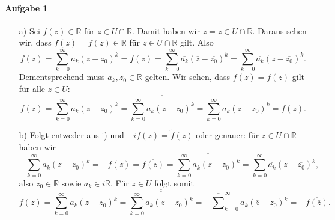 \documentclass[11pt,a4paper]{article}
\theoremstyle{definition} \newtheorem{theo}{Theorem}[section]
\theoremstyle{definition} \newtheorem{defi}{Definition}[section]
\theoremstyle{definition} \newtheorem{cor}{Corollary}[section]
\theoremstyle{definition} \newtheorem{lemmas}{Lemma}[section]
\theoremstyle{definition} \newtheorem{assp}{Assumption}[section]
\theoremstyle{definition} \newtheorem{exam}{Example}[section]
\theoremstyle{definition} \newtheorem{sol}{Lösung}
\begin{document}
\paragraph{Aufgabe 1}
\begin{itemize}
	\item[a)] Sei $f(z)\in \mathbb{R}$ für $z\in U\cap \mathbb{R}$. Damit haben wir $z=\overline{z}\in U\cap \mathbb{R}$. Daraus sehen wir, dass $f(z)=f(\overline{z})\in \mathbb{R}$ für $z\in U\cap \mathbb{R}$ gilt. Also
	\begin{equation*}
	f(z)=\sum_{k=0}^{\infty}a_{k}(z-z_{0})^{k}=\overline{f(z)}=\sum_{k=0}^{\infty}\overline{a_{k}}(\overline{z}-\overline{z_{0}})^k=\sum_{k=0}^{\infty}\overline{a_{k}}(z-\overline{z_{0}})^k.
	\end{equation*}
	Dementsprechend muss $a_{k},z_{0}\in \mathbb{R}$ gelten. Wir sehen, dass $f(z)= \overline{f(\overline{z})}$ gilt für alle $z\in U$:
	\begin{equation*}
	f(z)=\sum_{k=0}^{\infty}a_{k}(z-z_{0})^{k}=\overline{\overline{\sum_{k=0}^{\infty}a_{k}(z-z_{0})^{k}}}=\overline{\sum_{k=0}^{\infty}a_{k}(\overline{z}-z_{0})^{k}}=\overline{f(\overline{z})}.
	\end{equation*}
	\item[b)] Folgt entweder aus i) und $-if(z)=\tilde{f}(z)$ oder genauer: für $z\in U\cap \mathbb{R}$ haben wir
	\begin{equation*}
	-\sum_{k=0}^{\infty}a_{k}(z-z_{0})^{k}=-f(z)=\overline{f(z)}=\overline{\sum_{k=0}^{\infty}a_{k}(z-z_{0})^{k}}= \sum_{k=0}^{\infty}\overline{a_{k}}(z-\overline{z_{0}})^{k},
	\end{equation*}
	also $z_{0}\in\mathbb{R}$ sowie $a_{k}\in i\mathbb{R}$. Für $z\in U$ folgt somit
	\begin{equation*}
	f(z)=\sum_{k=0}^{\infty}a_{k}(z-z_{0})^{k}=\overline{\overline{\sum_{k=0}^{\infty}a_{k}(z-z_{0})^{k}}}=-\overline \sum_{k=0}^{\infty}a_{k}(\overline{z}-z_{0})^{k}=-\overline{f(\overline{z})}.
	\end{equation*}
\end{itemize}
\end{document}
